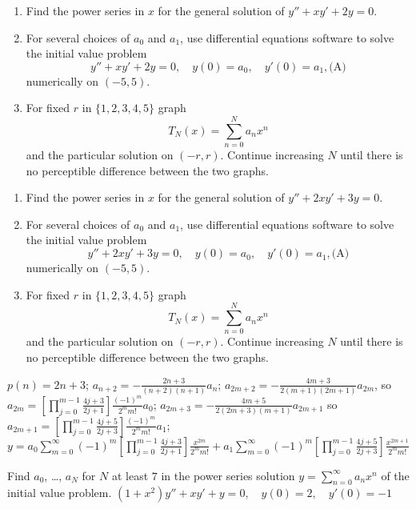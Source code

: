 \documentclass{ximera}
\begin{document}
\begin{problem}\label{exer:7.2.9}   
\begin{enumerate}
\item %
Find the power series in $x$ for the general solution of
$y''+xy'+2y=0$.
\item %
For several choices of $a_0$ and $a_1$,
use  differential equations software to solve the initial
value problem
$$
y''+xy'+2y=0,\quad y(0)=a_0,\quad y'(0)=a_1,
\text{(A)}
$$
numerically on $(-5,5)$.
\item %
For fixed $r$ in $\{1,2,3,4,5\}$ graph
$$
T_N(x)=\sum_{n=0}^N a_nx^n
$$
and the particular solution on $(-r,r)$.
Continue increasing $N$ until there is no perceptible
difference between the two graphs.
\end{enumerate}
\end{problem}

\begin{problem}\label{exer:7.2.10}
\begin{enumerate}
\item %
Find the power series in $x$ for the general solution of
$y''+2xy'+3y=0$.
\item %
For several choices of $a_0$ and $a_1$,
use  differential equations software to solve the initial
value problem
$$
y''+2xy'+3y=0,\quad y(0)=a_0,\quad y'(0)=a_1,
\text{(A)}
$$
numerically on $(-5,5)$.
\item %
For fixed $r$ in $\{1,2,3,4,5\}$ graph
$$
T_N(x)=\sum_{n=0}^N a_nx^n
$$
and the particular solution on $(-r,r)$.
Continue increasing $N$ until there is no perceptible
difference between the two graphs.
\end{enumerate}

\begin{solution}
    $p(n)=2n+3$;
$a_{n+2}=-\frac{2n+3}{(n+2)(n+1)}a_n$;
$a_{2m+2}=-\frac{4m+3}{2(m+1)(2m+1)}a_{2m}$, so
$a_{2m}=\left[\prod_{j=0}^{m-1}\frac{4j+3}{2j+1}\right]
\frac{(-1)^m}{2^mm!}a_0$;
$a_{2m+3}=-\frac{4m+5}{2(2m+3)(m+1)}a_{2m+1}$
 so $a_{2m+1}=
\left[\prod_{j=0}^{m-1}\frac{4j+5}{2j+3}\right]\frac{(-1)^m}{
2^mm!}a_1$;
$y=a_0\sum_{m=0}^\infty
(-1)^m\left[\prod_{j=0}^{m-1}\frac{4j+3}{2j+1}\right]\frac{x^{2m}}{2^mm!}
+a_1\sum_{m=0}^\infty
(-1)^m\left[\prod_{j=0}^{m-1}\frac{4j+5}{2j+3}\right]\frac{x^{2m+1}}{
2^mm!}$
\end{solution}
\end{problem}

\begin{problem}\label{exer:7.2.11} Find $a_0$, \dots, $a_N$ for $N$ at least $7$ in the power series solution $y=\sum_{n=0}^\infty a_nx^n$
of the initial value problem. $(1+x^2)y''+xy'+y=0,\quad y(0)=2,\quad
y'(0)=-1$
\end{problem}
\end{document}
